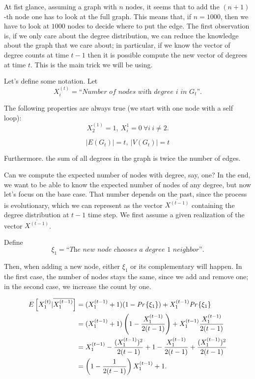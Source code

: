 At fist glance, assuming a graph with $n$ nodes, it seems that to add the $(n+1)$-th node one has to look at the full graph. This means that, if $n = 1000$, then we have to look at $1000$ nodes to decide where to put the edge. The first observation is, if we only care about the degree distribution, we can reduce the knowledge about the graph that we care about; in particular, if we know the vector of degree counts at time $t-1$ then it is possible compute the new vector of degrees at time $t$. This is the main trick we will be using.

Let's define some notation. Let
\begin{equation}
	X_i^{(t)} = \textit{``Number of nodes with degree $i$ in $G_t$''}.
\end{equation}

The following properties are always true (we start with one node with a self loop):
\begin{equation}
	X_2^{(1)} = 1,\ X_i^{{1}} = 0\ \forall i\ i \neq 2.
\end{equation}

\begin{equation}
	|E(G_t)| = t,\ |V(G_t)| = t
\end{equation}

Furthermore. the sum of all degrees in the graph is twice the number of edges.

Can we compute the expected number of nodes with degree, say, one? In the end, we want to be able to know the expected number of nodes of any degree, but now let's focus on the base case. That number depends on the past, since the process is evolutionary, which we can represent as the vector  $\overline{X^{(t-1)}}$ containing the degree distribution at $t-1$ time step. We first assume a given realization of the vector $\overline{X^{(t-1)}}$.

Define
\begin{equation}
	\xi_1 = \textit{``The new node chooses a degree $1$ neighbor''}.
\end{equation}

Then, when adding a new node, either $\xi_1$ or its complementary will happen. In the first case, the number of nodes stays the same, since we add and remove one; in the second case, we increase the count by one.

\begin{align*}
	E\left[X_1^{(t)} | \overline{X_1^{(t-1)}}\right] &= (X_1^{(t-1)} + 1)(1-\emph{Pr}\left\{\xi_1\right\}) + X_1^{(t-1)}\emph{Pr}\left\{\xi_1\right\}\\
	&=(X_1^{(t-1)} + 1)\left(1-\frac{X_1^{(t-1)}}{2(t-1)}\right) + X_1^{(t-1)}\frac{X_1^{(t-1)}}{2(t-1)}\\
	&=X_1^{(t-1)} -\frac{(X_1^{(t-1)})^2}{2(t-1)} + 1 - \frac{X_1^{(t-1)}}{2(t-1)} +\frac{(X_1^{(t-1)})^2}{2(t-1)}\\
	&= \left(1 - \frac{1}{2(t-1)}\right)X_1^{(t-1)} + 1.
\end{align*}

